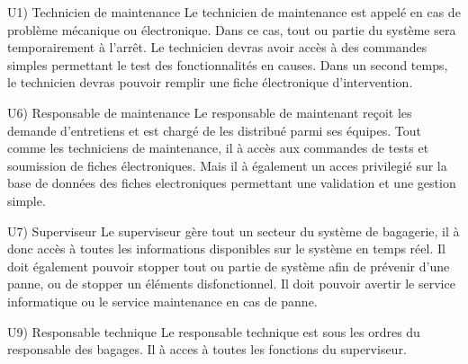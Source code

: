 U1) Technicien de maintenance
Le technicien de maintenance est appelé en cas de problème mécanique ou électronique.
Dans ce cas, tout ou partie du système sera temporairement à l'arrêt.
Le technicien devras avoir accès à des commandes simples permettant le test des fonctionnalités en causes.
Dans un second temps, le technicien devras pouvoir remplir une fiche électronique d'intervention.

U6) Responsable de maintenance
Le responsable de maintenant reçoit les demande d'entretiens et est chargé de les distribué parmi ses équipes.
Tout comme les techniciens de maintenance, il à accès aux commandes de tests et soumission de fiches électroniques.
Mais il à également un acces privilegié sur la base de données des fiches electroniques permettant une validation et une gestion simple.

U7) Superviseur
Le superviseur gère tout un secteur du système de bagagerie, il à donc accès à toutes les informations disponibles sur le système en temps réel.
Il doit également pouvoir stopper tout ou partie de système afin de prévenir d'une panne, ou de stopper un éléments disfonctionnel.
Il doit pouvoir avertir le service informatique ou le service maintenance en cas de panne.

U9) Responsable technique
Le responsable technique est sous les ordres du responsable des bagages.
Il à acces à toutes les fonctions du superviseur.
